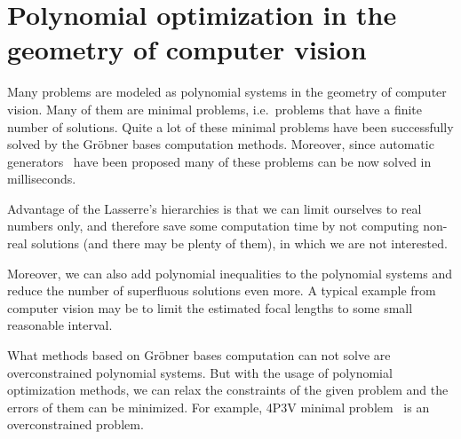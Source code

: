 \section{Polynomial optimization in the geometry of computer vision}
Many problems are modeled as polynomial systems in the geometry of computer vision.
Many of them are minimal problems, i.e.\ problems that have a finite number of solutions.
Quite a lot of these minimal problems have been successfully solved by the Gr\"obner bases computation methods.
Moreover, since automatic generators~\cite{AutoGen, Larsson2017} have been proposed many of these problems can be now solved in milliseconds.

Advantage of the Lasserre's hierarchies is that we can limit ourselves to real numbers only, and therefore save some computation time by not computing non-real solutions (and there may be plenty of them), in which we are not interested.

Moreover, we can also add polynomial inequalities to the polynomial systems and reduce the number of superfluous solutions even more. A typical example from computer vision may be to limit the estimated focal lengths to some small reasonable interval.

What methods based on Gr\"obner bases computation can not solve are overconstrained polynomial systems.
But with the usage of polynomial optimization methods, we can relax the constraints of the given problem and the errors of them can be minimized. For example, 4P3V minimal problem~\cite{4p3v} is an overconstrained problem.
